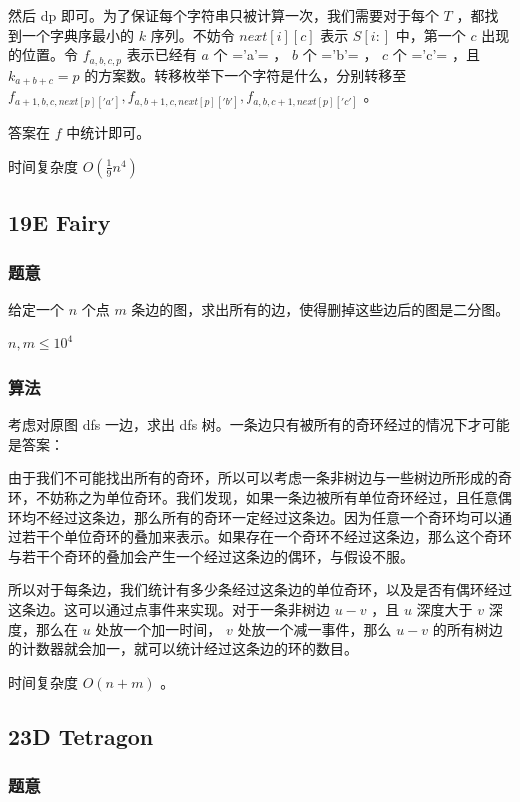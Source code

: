 \documentclass[11pt]{article}
\begin{document}
    然后 dp 即可。为了保证每个字符串只被计算一次，我们需要对于每个 $T$ ，都找到一个字典序最小的 $k$ 序列。不妨令 $next[i][c]$ 表示 $S[i:]$ 中，第一个 $c$ 出现的位置。令 $f_{a, b, c, p}$ 表示已经有 $a$ 个 ='a'= ， $b$ 个 ='b'= ， $c$ 个 ='c'= ，且 $k_{a + b + c} = p$ 的方案数。转移枚举下一个字符是什么，分别转移至 $f_{a + 1, b, c, next[p]['a']}, f_{a, b + 1, c, next[p]['b']}, f_{a, b, c + 1,next[p]['c']}$ 。

    答案在 $f$ 中统计即可。

    时间复杂度 $O(\frac{1}{9}n^4)$
\subsection{19E   Fairy}
\label{sec-1-8}
\subsubsection{题意}
\label{sec-1-8-1}

    给定一个 $n$ 个点 $m$ 条边的图，求出所有的边，使得删掉这些边后的图是二分图。

    $n, m \leq 10^4$
\subsubsection{算法}
\label{sec-1-8-2}

    考虑对原图 dfs 一边，求出 dfs 树。一条边只有被所有的奇环经过的情况下才可能是答案：

    由于我们不可能找出所有的奇环，所以可以考虑一条非树边与一些树边所形成的奇环，不妨称之为单位奇环。我们发现，如果一条边被所有单位奇环经过，且任意偶环均不经过这条边，那么所有的奇环一定经过这条边。因为任意一个奇环均可以通过若干个单位奇环的叠加来表示。如果存在一个奇环不经过这条边，那么这个奇环与若干个奇环的叠加会产生一个经过这条边的偶环，与假设不服。

    所以对于每条边，我们统计有多少条经过这条边的单位奇环，以及是否有偶环经过这条边。这可以通过点事件来实现。对于一条非树边 $u-v$ ，且 
$u$ 深度大于 $v$ 深度，那么在 $u$ 处放一个加一时间， $v$ 处放一个减一事件，那么 $u-v$ 的所有树边的计数器就会加一，就可以统计经过这条边的环的数目。

    时间复杂度 $O(n + m)$ 。
\subsection{23D   Tetragon}
\label{sec-1-9}
\subsubsection{题意}
\label{sec-1-9-1}
\end{document}
